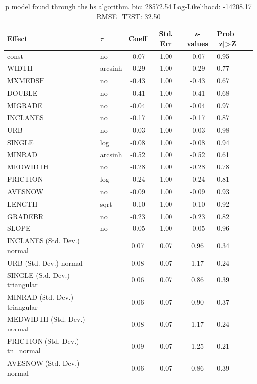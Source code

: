 \begin{table}
	\caption{p model found through the hs algorithm. bic: 28572.54 Log-Likelihood: -14208.17 RMSE_TEST: 32.50}
	\begin{center}
		\begin{tabular}{|l|l|c|c|c|l|}
			\hline
			Effect & $\tau$ & Coeff & Std. Err & z-values & Prob |z|>Z \\
			\hline
			const & no & -0.07 & 1.00 & -0.07 & 0.95 \\
			\hline
			WIDTH & arcsinh & -0.29 & 1.00 & -0.29 & 0.77 \\
			\hline
			MXMEDSH & no & -0.43 & 1.00 & -0.43 & 0.67 \\
			\hline
			DOUBLE & no & -0.41 & 1.00 & -0.41 & 0.68 \\
			\hline
			MIGRADE & no & -0.04 & 1.00 & -0.04 & 0.97 \\
			\hline
			INCLANES & no & -0.17 & 1.00 & -0.17 & 0.87 \\
			\hline
			URB & no & -0.03 & 1.00 & -0.03 & 0.98 \\
			\hline
			SINGLE & log & -0.08 & 1.00 & -0.08 & 0.94 \\
			\hline
			MINRAD & arcsinh & -0.52 & 1.00 & -0.52 & 0.61 \\
			\hline
			MEDWIDTH & no & -0.28 & 1.00 & -0.28 & 0.78 \\
			\hline
			FRICTION & log & -0.24 & 1.00 & -0.24 & 0.81 \\
			\hline
			AVESNOW & no & -0.09 & 1.00 & -0.09 & 0.93 \\
			\hline
			LENGTH & sqrt & -0.10 & 1.00 & -0.10 & 0.92 \\
			\hline
			GRADEBR & no & -0.23 & 1.00 & -0.23 & 0.82 \\
			\hline
			SLOPE & no & -0.05 & 1.00 & -0.05 & 0.96 \\
			\hline
			INCLANES (Std. Dev.) normal &  & 0.07 & 0.07 & 0.96 & 0.34 \\
			\hline
			URB (Std. Dev.) normal &  & 0.08 & 0.07 & 1.17 & 0.24 \\
			\hline
			SINGLE (Std. Dev.) triangular &  & 0.06 & 0.07 & 0.86 & 0.39 \\
			\hline
			MINRAD (Std. Dev.) triangular &  & 0.06 & 0.07 & 0.90 & 0.37 \\
			\hline
			MEDWIDTH (Std. Dev.) normal &  & 0.08 & 0.07 & 1.17 & 0.24 \\
			\hline
			FRICTION (Std. Dev.) tn_normal &  & 0.09 & 0.07 & 1.25 & 0.21 \\
			\hline
			AVESNOW (Std. Dev.) normal &  & 0.06 & 0.07 & 0.86 & 0.39 \\

\end{tabular}
\end{center}
\end{table}
